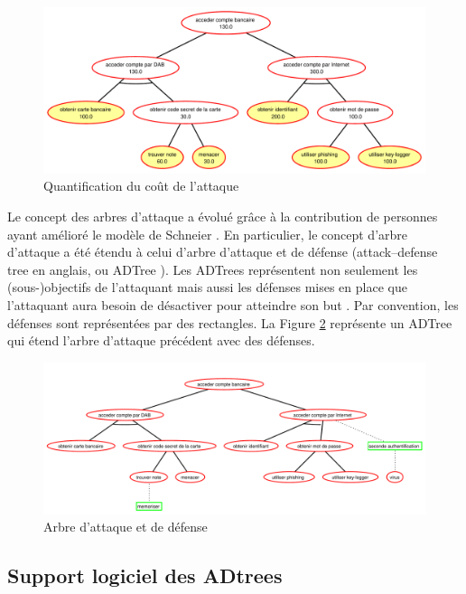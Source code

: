         \begin{figure}[h]
	        \centering
	        \includegraphics[width=1\textwidth]{figure/quantification.pdf}
	        \caption{Quantification du coût de l'attaque}
	        \label{fig:arbre_exemple_2}
        \end{figure}

		Le concept des arbres d'attaque a évolué grâce à la contribution de personnes ayant amélioré le modèle de {\sc Schneier} \cite{ADTreeKordy}. En particulier, le concept d'arbre d'attaque a été étendu à celui d’arbre d’attaque et de défense (\og attack–defense tree \fg{} en anglais, ou \og ADTree \fg{}). Les ADTrees représentent non seulement les (sous-)objectifs de l'attaquant mais aussi les défenses mises en place que l'attaquant aura besoin de désactiver pour atteindre son but \cite{ADTreeOxford}. Par convention, les défenses sont représentées par des rectangles. La Figure \ref{fig:arbre_exemple_3} représente un ADTree qui étend l'arbre d'attaque précédent avec des défenses.
        \begin{figure}[h]
			\centering
	        \includegraphics[width=1\textwidth]{figure/exemple2_rapport.pdf}
	        \caption{Arbre d'attaque et de défense}
	        \label{fig:arbre_exemple_3}
        \end{figure}

        \subsection{Support logiciel des ADtrees}
    
